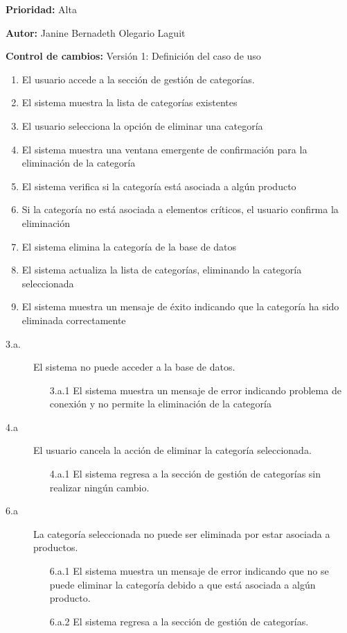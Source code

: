 \textbf{Prioridad: }
Alta
\vspace{0.15cm}

\textbf{Autor: }
Janine Bernadeth Olegario Laguit\par
\vspace{0.15cm}

\textbf{Control de cambios: } Versión 1: Definición del caso de uso

\begin{enumerate}
    \item El usuario accede a la sección de gestión de categorías.
    \item El sistema muestra la lista de categorías existentes
    \item El usuario selecciona la opción de eliminar una categoría
    \item El sistema muestra una ventana emergente de confirmación para la eliminación de la categoría
    \item El sistema verifica si la categoría está asociada a algún producto
    \item Si la categoría no está asociada a elementos críticos, el usuario confirma la eliminación
    \item El sistema elimina la categoría de la base de datos
    \item El sistema actualiza la lista de categorías, eliminando la categoría seleccionada
    \item El sistema muestra un mensaje de éxito indicando que la categoría ha sido eliminada correctamente
\end{enumerate}

\begin{description}
    \item[3.a.] El sistema no puede acceder a la base de datos.
    \begin{enumerate}
        \item[3.a.1] El sistema muestra un mensaje de error indicando problema de conexión y no permite la eliminación de la categoría
    \end{enumerate}

    \item[4.a] El usuario cancela la acción de eliminar la categoría seleccionada.
    \begin{enumerate}
        \item[4.a.1] El sistema regresa a la sección de gestión de categorías sin realizar ningún cambio.
    \end{enumerate}

     \item[6.a] La categoría seleccionada no puede ser eliminada por estar asociada a productos.
    \begin{enumerate}
        \item[6.a.1]  El sistema muestra un mensaje de error indicando que no se puede eliminar la categoría debido a que está asociada a algún producto.
        \item[6.a.2]  El sistema regresa a la sección de gestión de categorías.
    \end{enumerate}
\end{description}

